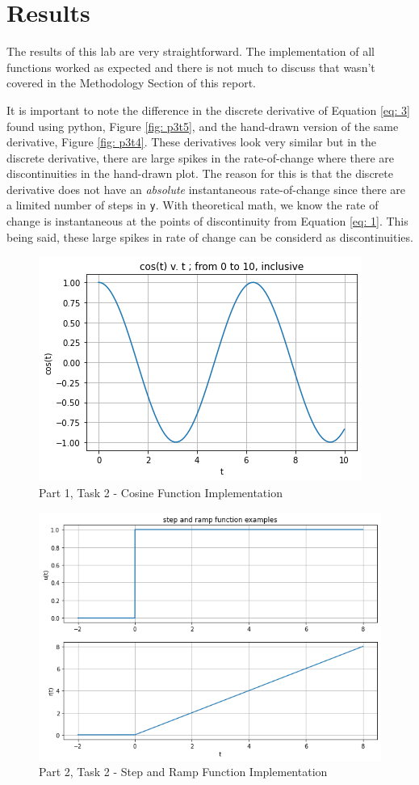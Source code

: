 \documentclass[12pt]{report}
\begin{document}
\section{Results}
The results of this lab are very straightforward. The implementation of all functions worked as expected and there is not much to discuss that wasn't covered in the Methodology 
Section of this report. 

It is important to note the difference in the discrete derivative of Equation \eqref{eq: 3} found using python, Figure \ref{fig: p3t5}, and the hand-drawn version of the same derivative, Figure \ref{fig: p3t4}. 
These derivatives look very similar but in the discrete derivative, there are large spikes in the rate-of-change where there are discontinuities in the hand-drawn plot. The reason
for this is that the discrete derivative does not have an \textit{absolute} instantaneous rate-of-change since there are a limited number of steps in \texttt{y}. With theoretical math, 
we know the rate of change is instantaneous at the points of discontinuity from Equation \eqref{eq: 1}. This being said, these large spikes in rate of change can be considerd as discontinuities.
\\
\begin{figure}[h!]
  \centering
  \includegraphics[scale=0.6]{p1t2.png}
  \caption{Part 1, Task 2 - Cosine Function Implementation}
  \label{fig: p1t2}
\end{figure}
\begin{figure}[h!]
  \centering
  \includegraphics[scale=0.5]{p2t2.png}
  \caption{Part 2, Task 2 - Step and Ramp Function Implementation}
  \label{fig: p2t2}
\end{figure}
\end{document}
